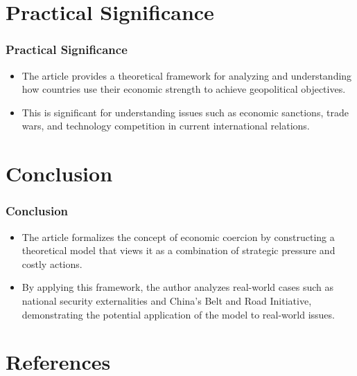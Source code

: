 \documentclass{beamer}
\begin{document}
\section{Practical Significance}

\begin{frame}
	\frametitle{Practical Significance}
	\begin{itemize}
		\item The article provides a theoretical framework for analyzing and understanding how countries use their economic strength to achieve geopolitical objectives.
		\item This is significant for understanding issues such as economic sanctions, trade wars, and technology competition in current international relations.
	\end{itemize}
\end{frame}

\section{Conclusion}

\begin{frame}
	\frametitle{Conclusion}
	\begin{itemize}
		\item The article formalizes the concept of economic coercion by constructing a theoretical model that views it as a combination of strategic pressure and costly actions.
		\item By applying this framework, the author analyzes real-world cases such as national security externalities and China's Belt and Road Initiative, demonstrating the potential application of the model to real-world issues.
	\end{itemize}
\end{frame}

\section*{References}

\begin{frame}
	
	
\end{frame}
\end{document}
